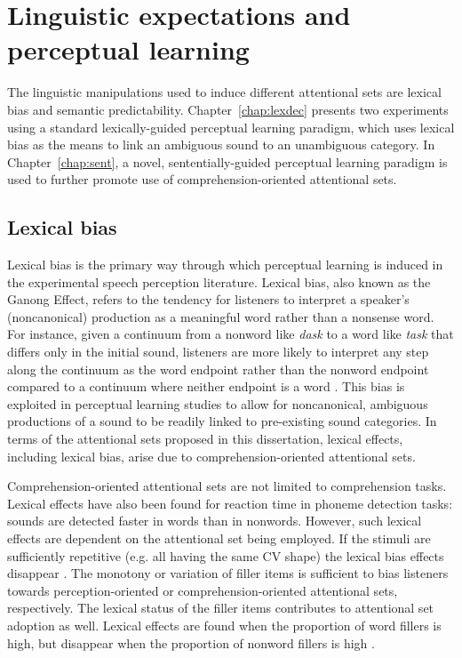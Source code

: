 \section{Linguistic expectations and perceptual learning}
\label{sec:linguistic}

The linguistic manipulations used to induce different attentional sets are lexical bias and semantic predictability.
Chapter~\ref{chap:lexdec} presents two experiments using a standard lexically-guided perceptual learning paradigm, which uses lexical bias as the means to link an ambiguous sound to an unambiguous category.
In Chapter~\ref{chap:sent}, a novel, sententially-guided perceptual learning paradigm is used to further promote use of comprehension-oriented attentional sets.

\subsection{Lexical bias}
\label{sec:lexicalbias}

Lexical bias is the primary way through which perceptual learning is induced in the experimental speech perception literature.
Lexical bias, also known as the Ganong Effect, refers to the tendency for listeners to interpret a speaker's (noncanonical) production as a meaningful word rather than a nonsense word.  
For instance, given a continuum from a nonword like \emph{dask} to a word like \emph{task} that differs only in the initial sound, listeners are more likely to interpret any step along the continuum as the word endpoint rather than the nonword endpoint compared to a continuum where neither endpoint is a word \citep{Ganong1980}. 
This bias is exploited in perceptual learning studies to allow for noncanonical, ambiguous productions of a sound to be readily linked to pre-existing sound categories.
In terms of the attentional sets proposed in this dissertation, lexical effects, including lexical bias, arise due to comprehension-oriented attentional sets.

Comprehension-oriented attentional sets are not limited to comprehension tasks.
Lexical effects have also been found for reaction time in phoneme detection tasks:
sounds are detected faster in words than in nonwords.
However, such lexical effects are dependent on the attentional set being employed.  
If the stimuli are sufficiently repetitive (e.g. all having the same CV shape) the lexical bias effects disappear \citep{Cutler1987}.
The monotony or variation of filler items is sufficient to bias listeners towards perception-oriented or comprehension-oriented attentional sets, respectively.
The lexical status of the filler items contributes to attentional set adoption as well.
Lexical effects are found when the proportion of word fillers is high, but disappear when the proportion of nonword fillers is high \citep{Mirman2008}.

